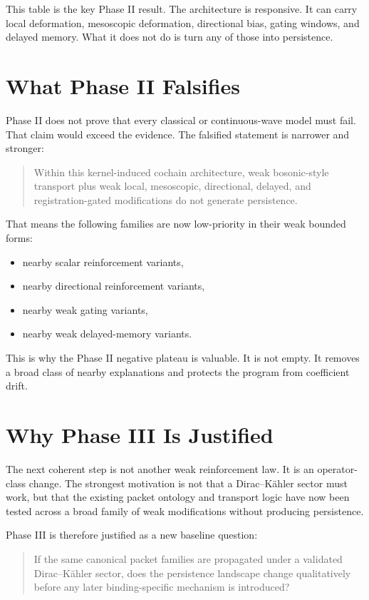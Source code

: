\documentclass[11pt]{article}
\begin{document}
This table is the key Phase II result. The architecture is responsive. It can carry local deformation, mesoscopic deformation, directional bias, gating windows, and delayed memory. What it does not do is turn any of those into persistence.

\section{What Phase II Falsifies}

Phase II does not prove that every classical or continuous-wave model must fail. That claim would exceed the evidence. The falsified statement is narrower and stronger:

\begin{quote}
Within this kernel-induced cochain architecture, weak bosonic-style transport plus weak local, mesoscopic, directional, delayed, and registration-gated modifications do not generate persistence.
\end{quote}

That means the following families are now low-priority in their weak bounded forms:
\begin{itemize}
\item nearby scalar reinforcement variants,
\item nearby directional reinforcement variants,
\item nearby weak gating variants,
\item nearby weak delayed-memory variants.
\end{itemize}

This is why the Phase II negative plateau is valuable. It is not empty. It removes a broad class of nearby explanations and protects the program from coefficient drift.

\section{Why Phase III Is Justified}

The next coherent step is not another weak reinforcement law. It is an operator-class change. The strongest motivation is not that a Dirac--K\"ahler sector must work, but that the existing packet ontology and transport logic have now been tested across a broad family of weak modifications without producing persistence.

Phase III is therefore justified as a new baseline question:

\begin{quote}
If the same canonical packet families are propagated under a validated Dirac--K\"ahler sector, does the persistence landscape change qualitatively before any later binding-specific mechanism is introduced?
\end{quote}
\end{document}
